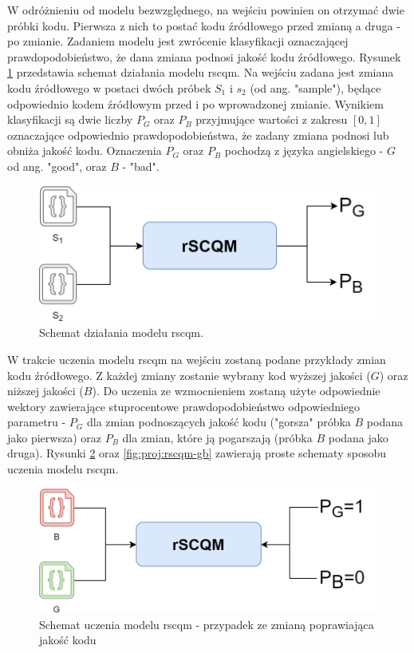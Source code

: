 \documentclass[12pt]{report}
\begin{document}
W odróżnieniu od modelu bezwzględnego, na wejściu powinien on otrzymać dwie próbki kodu. Pierwsza z nich to postać kodu źródłowego przed zmianą a druga - po zmianie. Zadaniem modelu jest zwrócenie klasyfikacji oznaczającej prawdopodobieństwo, że dana zmiana podnosi jakość kodu źródłowego. Rysunek \ref{fig:proj:rscqm-ss} przedstawia schemat działania modelu \gls{rscqm}. Na wejściu zadana jest zmiana kodu źródłowego w postaci dwóch próbek $S_1$ i $s_2$ (od ang. "sample"), będące odpowiednio kodem źródłowym przed i po wprowadzonej zmianie. Wynikiem klasyfikacji są dwie liczby $P_G$ oraz $P_B$ przyjmujące wartości z zakresu $[0,1]$ oznaczające odpowiednio prawdopodobieństwa, że zadany zmiana podnosi lub obniża jakość kodu. Oznaczenia $P_G$ oraz $P_B$ pochodzą z języka angielskiego - $G$ od ang. "good", oraz $B$ - "bad".

\begin{figure}
\centering
\includegraphics[width=\textwidth]{proj/rscqm-ss.png}
\caption{Schemat działania modelu \gls{rscqm}.}
\label{fig:proj:rscqm-ss}
\end{figure}

W trakcie uczenia modelu \gls{rscqm} na wejściu zostaną podane przykłady zmian kodu źródłowego. Z każdej zmiany zostanie wybrany kod wyższej jakości ($G$) oraz niższej jakości ($B$). Do uczenia ze wzmocnieniem zostaną użyte odpowiednie wektory zawierające stuprocentowe prawdopodobieństwo odpowiedniego parametru - $P_G$ dla zmian podnoszących jakość kodu ("gorsza" próbka $B$ podana jako pierwsza) oraz $P_B$ dla zmian, które ją pogarszają (próbka $B$ podana jako druga). Rysunki \ref{fig:proj:rscqm-bg} oraz \ref{fig:proj:rscqm-gb} zawierają proste schematy sposobu uczenia modelu \gls{rscqm}.

\begin{figure}
\centering
\includegraphics[width=\textwidth]{proj/rscqm-bg.png}
\caption{Schemat uczenia modelu \gls{rscqm} - przypadek ze zmianą poprawiająca jakość kodu}
\label{fig:proj:rscqm-bg}
\end{figure}
\end{document}
